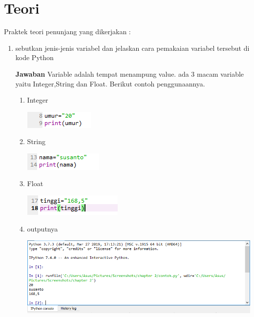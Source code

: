 \section{Teori}
Praktek teori penunjang yang dikerjakan :
\begin{enumerate}
\item
sebutkan jenis-jenis variabel dan jelaskan cara pemakaian variabel tersebut di kode Python
\par\textbf{Jawaban}
     Variable adalah tempat menampung value. ada 3 macam variable yaitu Integer,String dan Float. Berikut contoh penggunaannya.
\begin{enumerate}
    \item Integer
    \begin{center}
        \centering
        \includegraphics[scale=2]{figures/chapter 2/1.PNG}
    \end{center}

    \item String
    \begin{center}
        \centering
        \includegraphics[scale=2]{figures/chapter 2/2.PNG}
    \end{center}

    \item Float
    \begin{center}
        \centering
        \includegraphics[scale=2]{figures/chapter 2/3.PNG}
    \end{center}

    
    \item outputnya
    \begin{center}
        \centering
        \includegraphics[scale=0.5]{figures/chapter 2/4.PNG}
    \end{center}
    \end{enumerate}




\end{enumerate}
